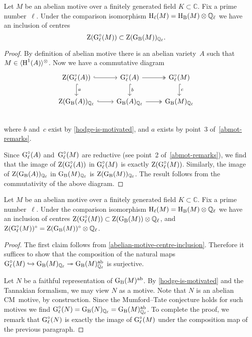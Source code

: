 \documentclass[10pt,twoside,leqno]{article}
\numberwithin{equation}{subsection}
\newcommand{\into}{\hookrightarrow}
\newcommand{\onto}{\twoheadrightarrow}
\newcommand{\QQ}{\mathbb{Q}}
\newcommand{\QQl}{\QQ_{\ell}}
\newcommand{\CC}{\mathbb{C}}
\newcommand{\ab}{\textnormal{ab}}
\newcommand{\HH}{\textnormal{H}}
\newcommand{\Hl}{\HH_{\ell}}
\newcommand{\HB}{\HH_{\textnormal{B}}}
\newcommand{\Zentrum}{\textnormal{Z}}
\newcommand{\GG}{\textnormal{G}}
\newcommand{\GB}{\GG_{\textnormal{B}}}
\newcommand{\Gl}{\GG_{\ell}}
\newcommand{\Glc}{\Gl^{\circ}}
\newcommand{\Tangen}[1]{\langle #1 \rangle^{\otimes}}
\begin{document}
\begin{lemma} %
 \label{abelian-motive-centre-inclusion}
 Let $M$ be an abelian motive over
 a finitely generated field $K \subset \CC$.
 Fix a prime number~$\ell$.
 Under the comparison isomorphism $\Hl(M) = \HB(M) \otimes \QQl$
 we have an inclusion of centres
 \[
  \Zentrum(\Glc(M)) \subset \Zentrum(\GB(M))_{\QQl}.
 \]
 \begin{proof}
  By definition of abelian motive there is an abelian variety~$A$
  such that $M \in \Tangen{\HH^1(A)}$.
  Now we have a commutative diagram
  \[
   \begin{tikzcd}
    \Zentrum(\Glc(A)) \ar[r,hook] \ar[d,hook,"a"] &
    \Glc(A) \ar[r,two heads] \ar[d,hook,"b"] &
    \Glc(M) \ar[d,hook,"c"] \\
    \Zentrum(\GB(A))_{\QQl} \ar[r,hook] &
    \GB(A)_{\QQl} \ar[r,two heads] &
    \GB(M)_{\QQl} \\
   \end{tikzcd}
  \]
  where $b$ and~$c$ exist by \cref{hodge-is-motivated},
  and $a$ exists by point~3 of~\cref{abmot-remarks}.

  Since $\Glc(A)$ and~$\Glc(M)$ are reductive
  (see point~2 of~\cref{abmot-remarks}),
  we find that the image of $\Zentrum(\Glc(A))$ in $\Glc(M)$
  is exactly $\Zentrum(\Glc(M))$.
  Similarly,
  the image of $\Zentrum(\GB(A))_{\QQl}$ in $\GB(M)_{\QQl}$ is
  $\Zentrum(\GB(M))_{\QQl}$.
  The result follows from the commutativity of the above diagram.
 \end{proof}
\end{lemma}

\begin{lemma} %
 \label{centre-mtc-abelian-motive}
 Let $M$ be an abelian motive over
 a finitely generated field $K \subset \CC$.
 Fix a prime number~$\ell$.
 Under the comparison isomorphism $\Hl(M) = \HB(M) \otimes \QQl$
 we have an inclusion of centres
 $\Zentrum(\Glc(M)) \subset \Zentrum(\GB(M)) \otimes \QQl$, and
 $\Zentrum(\Glc(M))^\circ = \Zentrum(\GB(M))^\circ \otimes \QQl$.
 \begin{proof}
  The first claim follows from \cref{abelian-motive-centre-inclusion}.
  Therefore it suffices to show that the composition
  of the natural maps
  $\Glc(M) \into \GB(M)_{\QQl} \onto \GB(M)^\ab_{\QQl}$
  is surjective.

  Let $N$ be a faithful representation of $\GB(M)^\ab$.
  By \cref{hodge-is-motivated} and the Tannakian formalism,
  we may view $N$ as a motive. %
  Note that $N$ is an abelian CM~motive, by construction.
  Since the Mumford--Tate conjecture holds for such motives %
  we find $\Glc(N) = \GB(N)_{\QQl} = \GB(M)^\ab_{\QQl}$.
  To complete the proof,
  we remark that $\Glc(N)$ is exactly the image of $\Glc(M)$
  under the composition map of the previous paragraph.
 \end{proof}
\end{lemma}
\end{document}
